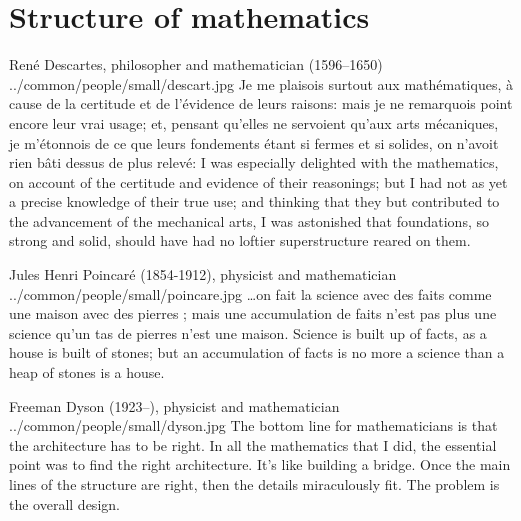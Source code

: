 \section*{Structure of mathematics}
\qboxnpqt
  {Ren\'e Descartes, philosopher and mathematician (1596--1650)
   \footnotemark}
  {../common/people/small/descart.jpg}
  {Je me plaisois surtout aux math\'ematiques,
    \`a cause de la certitude et de l'\'evidence de leurs raisons:
    mais je ne remarquois point encore leur vrai usage;
    et, pensant qu'elles ne servoient qu'aux arts m\'ecaniques,
    je m'\'etonnois de ce que leurs fondements \'etant si fermes et si solides,
    on n'avoit rien b\^ati dessus de plus relev\'e:}
  {I was especially delighted with the mathematics,
    on account of the certitude and evidence of their reasonings;
    but I had not as yet a precise knowledge of their true use;
    and thinking that they but contributed to the advancement of the mechanical arts,
    I was astonished that foundations, so strong and solid,
    should have had no loftier superstructure reared on them.}

\qboxnpqt
  { Jules Henri Poincar\'e (1854-1912), physicist and mathematician
    \footnotemark
  }
  {../common/people/small/poincare.jpg}
  {\ldots on fait la science avec des faits comme une maison avec des pierres ; 
   mais une accumulation de faits n'est pas plus une science qu'un tas de 
   pierres n'est une maison.}
  {Science is built up of facts, as a house is built of stones;
   but an accumulation of facts is no more a science than a heap of stones is a house.}


\qboxnps
  {
    Freeman Dyson (1923--), physicist and mathematician  %
    \footnotemark
  }
  {../common/people/small/dyson.jpg}
  {The bottom line for mathematicians is that the architecture has to be right.
    In all the mathematics that I did, the essential point was to find
    the right architecture.
    It's like building a bridge.
    Once the main lines of the structure are right,
    then the details miraculously fit.
    The problem is the overall design.}

